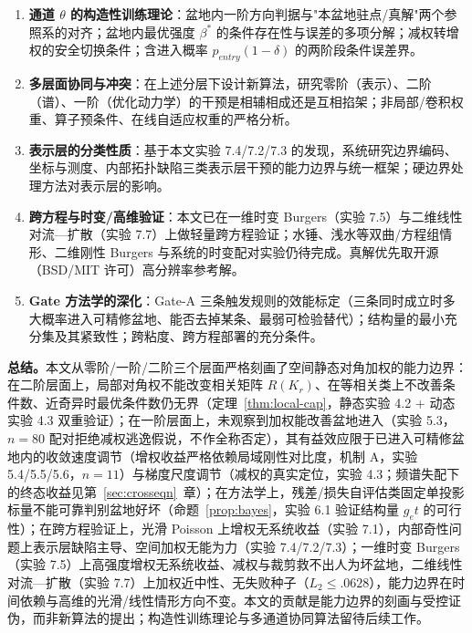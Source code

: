 \documentclass[fontset=windows,11pt]{ctexart}
\numberwithin{equation}{section}
\begin{document}
\begin{enumerate}[label=(\arabic*),leftmargin=2em,itemsep=1pt]
\item \textbf{通道 $\theta$ 的构造性训练理论}：盆地内一阶方向判据与"本盆地驻点/真解"两个参照系的对齐；盆地内最优强度 $\beta^*$ 的条件存在性与误差的多项分解；减权转增权的安全切换条件；含进入概率 $p_{entry}(1-\delta)$ 的两阶段条件误差界。
\item \textbf{多层面协同与冲突}：在上述分层下设计新算法，研究零阶（表示）、二阶（谱）、一阶（优化动力学）的干预是相辅相成还是互相掐架；非局部/卷积权重、算子预条件、在线自适应权重的严格分析。
\item \textbf{表示层的分类性质}：基于本文实验 7.4/7.2/7.3 的发现，系统研究边界编码、坐标与测度、内部拓扑缺陷三类表示层干预的能力边界与统一框架；硬边界处理方法对表示层的影响。
\item \textbf{跨方程与时变/高维验证}：本文已在一维时变 Burgers（实验 7.5）与二维线性对流—扩散（实验 7.7）上做轻量跨方程验证；水锤、浅水等双曲/方程组情形、二维刚性 Burgers 与系统的时变配对实验仍待完成。真解优先取开源（BSD/MIT 许可）高分辨率参考解。
\item \textbf{Gate 方法学的深化}：Gate-A 三条触发规则的效能标定（三条同时成立时多大概率进入可精修盆地、能否去掉某条、最弱可检验替代）；结构量的最小充分集及其紧致性；跨粘度、跨方程部署的充分条件。
\end{enumerate}

\noindent\textbf{总结。}本文从零阶/一阶/二阶三个层面严格刻画了空间静态对角加权的能力边界：在二阶层面上，局部对角权不能改变相关矩阵 $R(K_r)$、在等相关类上不改善条件数、近奇异时最优条件数仍无界（定理~\ref{thm:local-cap}，静态实验 4.2 + 动态实验 4.3 双重验证）；在一阶层面上，未观察到加权能改善盆地进入（实验 5.3，$n=80$ 配对拒绝减权逃逸假说，不作全称否定），其有益效应限于已进入可精修盆地内的收敛速度调节（增权收益严格依赖局域刚性对比度，机制 A，实验 5.4/5.5/5.6，$n=11$）与梯度尺度调节（减权的真实定位，实验 4.3；频谱失配下的终态收益见第~\ref{sec:crosseqn}~章）；在方法学上，残差/损失自评估类固定单投影标量不能可靠判别盆地好坏（命题~\ref{prop:bayes}，实验 6.1 验证结构量 $g_et$ 的可行性）；在跨方程验证上，光滑 Poisson 上增权无系统收益（实验 7.1），内部奇性问题上表示层缺陷主导、空间加权无能为力（实验 7.4/7.2/7.3）；一维时变 Burgers（实验 7.5）上高强度增权无系统收益、减权与裁剪救不出人为坏盆地，二维线性对流—扩散（实验 7.7）上加权近中性、无失败种子（$L_2\le.0628$），能力边界在时间依赖与高维的光滑/线性情形方向不变。本文的贡献是能力边界的刻画与受控证伪，而非新算法的提出；构造性训练理论与多通道协同算法留待后续工作。
\end{document}
